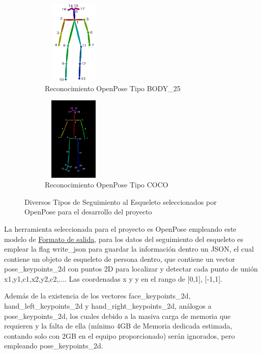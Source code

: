 \begin{figure}[ht]
	\centering
	\begin{subfigure}{.5\textwidth}
		\centering
		\includegraphics[width=3cm,height=4cm]{./Images/openposet1.png}
		\caption{Reconocimiento OpenPose Tipo BODY\_25}
		\label{open1}
	\end{subfigure}%
	\begin{subfigure}{.5\textwidth}
		\centering
		\includegraphics[width=3cm,height=4cm]{./Images/openposet2.png}
		\caption{Reconocimiento OpenPose Tipo COCO}
		\label{open2}
	\end{subfigure}
	\caption{Diversos Tipos de Seguimiento al Esqueleto seleccionados por OpenPose para el desarrollo del proyecto}
	\label{exampleesqueletotrack}
\end{figure}

La herramienta seleccionada para el proyecto es OpenPose empleando este modelo de \href{https://github.com/CMU-Perceptual-Computing-Lab/openpose/blob/master/doc/output.md}{Formato de salida}, para los datos del seguimiento del esqueleto es emplear la flag write\_json para guardar la información dentro un JSON, el cual contiene un objeto de esqueleto de persona dentro, que contiene un vector pose\_keypoints\_2d con puntos 2D para localizar y detectar cada punto de unión x1,y1,c1,x2,y2,c2,.... Las coordenadas x y y en el rango de [0,1], [-1,1].

Además de la existencia de los vectores face\_keypoints\_2d, hand\_left\_keypoints\_2d y hand\_right\_keypoints\_2d, análogos a pose\_keypoints\_2d, los cuales debido a la masiva carga de memoria que requieren y la falta de ella (mínimo 4GB de Memoria dedicada estimada, contando solo con 2GB en el equipo proporcionado) serán ignorados, pero empleando pose\_keypoints\_2d.

